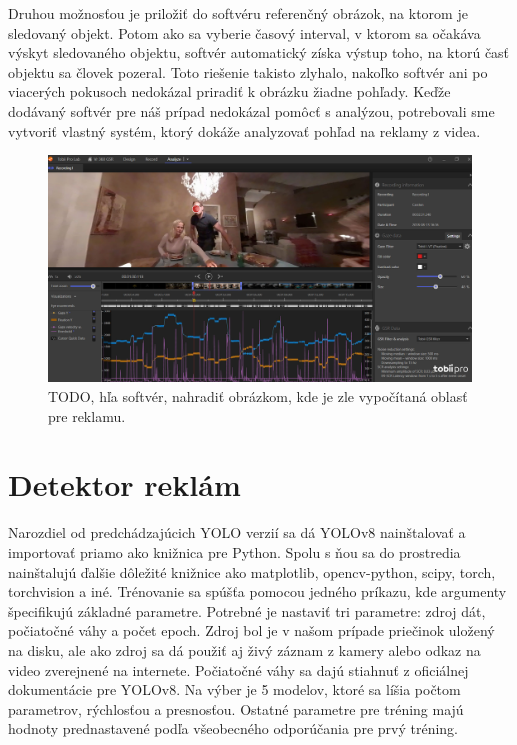 Druhou možnosťou je priložiť do softvéru referenčný obrázok, na ktorom je sledovaný objekt. Potom ako sa vyberie časový interval, v ktorom sa očakáva výskyt sledovaného objektu, softvér automatický získa výstup toho, na ktorú časť objektu sa človek pozeral. Toto riešenie takisto zlyhalo, nakoľko softvér ani po viacerých pokusoch nedokázal priradiť k obrázku žiadne pohľady. Keďže dodávaný softvér pre náš prípad nedokázal pomôcť s analýzou, potrebovali sme vytvoriť vlastný systém, ktorý dokáže analyzovať pohľad na reklamy z videa.
\\
\begin{figure}[ht]
    \centering
    \includegraphics[width=1\textwidth]{images/02/tobiiprolab3.jpg}
    \caption{TODO, hľa softvér, nahradiť obrázkom, kde je zle vypočítaná oblasť pre reklamu.}
    \label{img:lab}
\end{figure}


\section{Detektor reklám}

Narozdiel od predchádzajúcich YOLO verzií sa dá YOLOv8 nainštalovať a importovať priamo ako knižnica pre Python. Spolu s ňou sa do prostredia nainštalujú ďalšie dôležité knižnice ako matplotlib, opencv-python, scipy, torch, torchvision a iné. Trénovanie sa spúšťa pomocou jedného príkazu, kde argumenty špecifikujú základné parametre. Potrebné je nastaviť tri parametre: zdroj dát, počiatočné váhy a počet epoch. Zdroj bol je v našom prípade priečinok uložený na disku, ale ako zdroj sa dá použiť aj živý záznam z kamery alebo odkaz na video zverejnené na internete. Počiatočné váhy sa dajú stiahnuť z oficiálnej dokumentácie pre YOLOv8. Na výber je 5 modelov, ktoré sa líšia počtom parametrov, rýchlosťou a presnosťou. Ostatné parametre pre tréning majú hodnoty prednastavené podľa všeobecného odporúčania pre prvý tréning.

